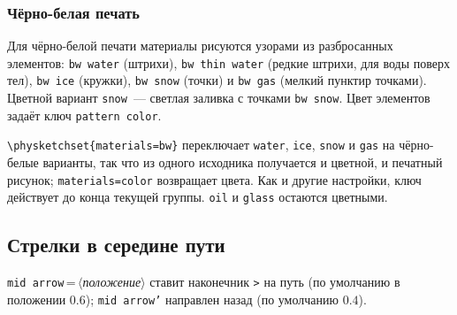 \documentclass[a4paper,11pt]{article}
\newcommand\key[1]{\texttt{#1}}
\newcommand\meta[1]{\ensuremath{\langle}\textit{#1}\ensuremath{\rangle}}
\begin{document}
\subsubsection*{Чёрно-белая печать}
Для чёрно-белой печати материалы рисуются узорами из разбросанных
элементов: \key{bw water} (штрихи), \key{bw thin water} (редкие штрихи,
для воды поверх тел), \key{bw ice} (кружки), \key{bw snow} (точки) и
\key{bw gas} (мелкий пунктир точками). Цветной вариант \key{snow}~---
светлая заливка с точками \key{bw snow}. Цвет элементов задаёт ключ
\key{pattern color}.
\begin{example}
\end{example}
\begin{tcolorbox}[colback=white, colframe=black!30, boxrule=0.4pt, arc=1mm]
\centering
{}
\end{tcolorbox}
\noindent\verb|\physketchset{materials=bw}| переключает \key{water}, \key{ice},
\key{snow} и \key{gas} на чёрно-белые варианты, так что из одного исходника
получается и цветной, и печатный рисунок; \verb|materials=color| возвращает
цвета. Как и другие настройки, ключ действует до конца текущей группы.
\key{oil} и \key{glass} остаются цветными.

\subsection{Стрелки в середине пути}
\key{mid arrow}\,=\,\meta{положение} ставит наконечник \verb|>| на путь
(по умолчанию в положении \(0.6\)); \key{mid arrow'} направлен назад (по
умолчанию \(0.4\)).
\begin{example}
\end{example}
\end{document}
